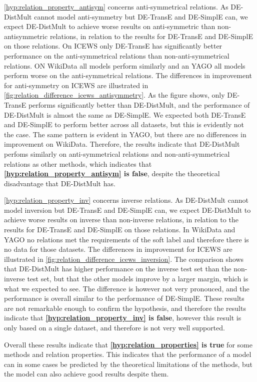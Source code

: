 

\autoref{hyp:relation_property_antisym} concerns anti-symmetrical relations. As DE-DistMult cannot model anti-symmetry but DE-TransE and DE-SimplE can, we expect DE-DistMult to achieve worse results on anti-symmetric than non-antisymmetric relations, in relation to the results for DE-TransE and DE-SimplE on those relations.
On ICEWS only DE-TransE has significantly better performance on the anti-symmetrical relations than non-anti-symmetrical relations.
ON WikiData all models perform similarly and an YAGO all models perform worse on the anti-symmetrical relations.
The differences in improvement for anti-symmetry on ICEWS are illustrated in \autoref{fig:relation_difference_icews_antisymmetry}.
As the figure shows, only DE-TransE performs significantly better than DE-DistMult, and the performance of DE-DistMult is almost the same as DE-SimplE.
We expected both DE-TransE and DE-SimplE to perform better across all datasets, but this is evidently not the case.
The same pattern is evident in YAGO, but there are no differences in improvement on WikiData.
Therefore, the results indicate that DE-DistMult perfoms similarly on anti-symmetrical relations and non-anti-symmetrical relations as other methods, which indicates that \textbf{\autoref{hyp:relation_property_antisym} is false}, despite the theoretical disadvantage that DE-DistMult has.

\autoref{hyp:relation_property_inv} concerns inverse relations. As DE-DistMult cannot model inversion but DE-TransE and DE-SimplE can, we expect DE-DistMult to achieve worse results on inverse than non-inverse relations, in relation to the results for DE-TransE and DE-SimplE on those relations.
In WikiData and YAGO no relations met the requirements of the soft label and therefore there is no data for those datasets. 
The differences in improvement for ICEWS are illustrated in \autoref{fig:relation_difference_icews_inversion}. 
The comparison shows that DE-DistMult has higher performance on the inverse test set than the non-inverse test set, 
but that the other models improve by a larger margin, which is what we expected to see.
The difference is however not very pronouced, and the performance is overall similar to the performance of DE-SimplE. These results are not remarkable enough to confirm the hypothesis, and therefore the results indicate that \textbf{\autoref{hyp:relation_property_inv} is false}, however this result is only based on a single dataset, and therefore is not very well supported.

Overall these results indicate that \textbf{\autoref{hyp:relation_properties} is true} for some methods and relation properties. This indicates that the performance of a model can in some cases be predicted by the theoretical limitations of the methods, but the model can also achieve good results despite them.